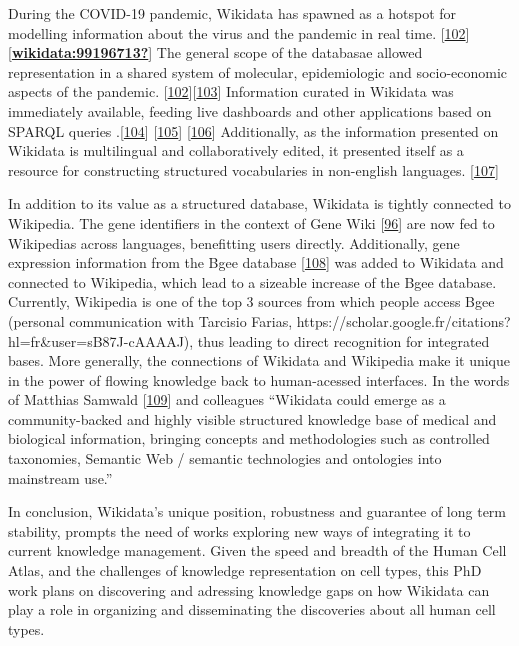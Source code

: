 During the COVID-19 pandemic, Wikidata has spawned as a hotspot for modelling information about the virus and the pandemic in real time. {[}\protect\hyperlink{ref-zH3KDqhp}{102}{]} {[}\protect\hyperlink{ref-wikidata:99196713}{\textbf{wikidata:99196713?}}{]}
The general scope of the databasae allowed representation in a shared system of molecular, epidemiologic and socio-economic aspects of the pandemic. {[}\protect\hyperlink{ref-zH3KDqhp}{102}{]}{[}\protect\hyperlink{ref-mPoPwN77}{103}{]}
Information curated in Wikidata was immediately available, feeding live dashboards and other applications based on SPARQL queries .{[}\protect\hyperlink{ref-3YCzr3jU}{104}{]} {[}\protect\hyperlink{ref-SkOeuFRd}{105}{]} {[}\protect\hyperlink{ref-AOVCR8mW}{106}{]}
Additionally, as the information presented on Wikidata is multilingual and collaboratively edited, it presented itself as a resource for constructing structured vocabularies in non-english languages. {[}\protect\hyperlink{ref-19wiU1LCA}{107}{]}

In addition to its value as a structured database, Wikidata is tightly connected to Wikipedia.
The gene identifiers in the context of Gene Wiki {[}\protect\hyperlink{ref-2ZhxC0dg}{96}{]} are now fed to Wikipedias across languages, benefitting users directly.
Additionally, gene expression information from the Bgee database {[}\protect\hyperlink{ref-10EWNsZCz}{108}{]} was added to Wikidata and connected to Wikipedia, which lead to a sizeable increase of the Bgee database. Currently, Wikipedia is one of the top 3 sources from which people access Bgee (personal communication with Tarcisio Farias, https://scholar.google.fr/citations?hl=fr\&user=sB87J-cAAAAJ), thus leading to direct recognition for integrated bases.
More generally, the connections of Wikidata and Wikipedia make it unique in the power of flowing knowledge back to human-acessed interfaces.
In the words of Matthias Samwald {[}\protect\hyperlink{ref-864Pcm4C}{109}{]} and colleagues ``Wikidata could emerge as a community-backed and highly visible structured knowledge base of medical and biological information, bringing concepts and methodologies such as controlled taxonomies, Semantic Web / semantic technologies and ontologies into mainstream use.''

In conclusion, Wikidata's unique position, robustness and guarantee of long term stability, prompts the need of works exploring new ways of integrating it to current knowledge management.
Given the speed and breadth of the Human Cell Atlas, and the challenges of knowledge representation on cell types, this PhD work plans on discovering and adressing knowledge gaps on how Wikidata can play a role in organizing and disseminating the discoveries about all human cell types.

